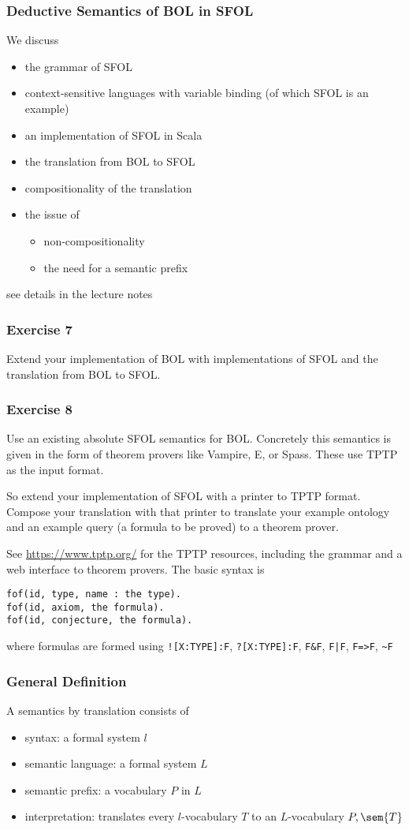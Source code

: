 \begin{frame}\frametitle{Deductive Semantics of BOL in SFOL}
We discuss
\begin{itemize}
\item the grammar of SFOL
\item context-sensitive languages with variable binding (of which SFOL is an example)
\item an implementation of SFOL in Scala
\item the translation from BOL to SFOL
\item compositionality of the translation
\item the issue of
 \begin{itemize}
 \item non-compositionality
 \item the need for a semantic prefix
 \end{itemize}
\end{itemize}
see details in the lecture notes
\end{frame}

\begin{frame}\frametitle{Exercise 7}
Extend your implementation of BOL with implementations of SFOL and the translation from BOL to SFOL.
\end{frame}

\begin{frame}[fragile]\frametitle{Exercise 8}
Use an existing absolute SFOL semantics for BOL.
Concretely this semantics is given in the form of theorem provers like Vampire, E, or Spass.
These use TPTP as the input format.

So extend your implementation of SFOL with a printer to TPTP format.
Compose your translation with that printer to translate your example ontology and an example query (a formula to be proved) to a theorem prover.

See \url{https://www.tptp.org/} for the TPTP resources, including the grammar and a web interface to theorem provers.
The basic syntax is
\begin{lstlisting}
fof(id, type, name : the type).
fof(id, axiom, the formula).
fof(id, conjecture, the formula).
\end{lstlisting}
where formulas are formed using \lstinline|![X:TYPE]:F|, \lstinline|?[X:TYPE]:F|, \lstinline|F&F|, \lstinline!F|F!, \lstinline|F=>F|, \lstinline|~F|
\end{frame}

\begin{frame}\frametitle{General Definition}
A semantics by translation consists of
\begin{itemize}
 \item syntax: a formal system $l$
 \item semantic language: a formal system $L$
 \item semantic prefix: a vocabulary $P$ in $L$
 \item interpretation: translates every $l$-vocabulary $T$ to an $L$-vocabulary $P,\sem{T}$
\end{itemize}
\end{frame}

